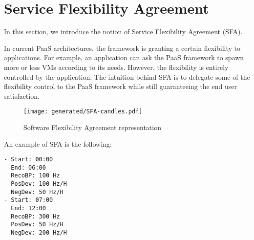 \section{Service Flexibility Agreement}
\label{sec:sfa}

In this section, we introduce the notion of Service Flexibility Agreement (SFA). 

In current PaaS architectures, the framework is granting a certain flexibility to applications.
For example, an application can ask the PaaS framework to spawn more or less VMs according to its needs.
However, the flexibility is entirely controlled by the application.
The intuition behind SFA is to delegate some of the flexibility control to the PaaS framework while still guaranteeing the end user satisfaction.






 

\begin{figure}[h]
\centering
\texttt{[image: generated/SFA-candles.pdf]}
\caption{Software Flexibility Agreement representation}
\label{fig:EASC}
\end{figure}

An example of SFA is the following:
\begin{lstlisting}[caption={SFA example}, label={lst:SFA}]
- Start: 00:00
  End: 06:00
  RecoBP: 100 Hz
  PosDev: 100 Hz/H
  NegDev: 50 Hz/H
- Start: 07:00
  End: 12:00
  RecoBP: 300 Hz
  PosDev: 50 Hz/H
  NegDev: 200 Hz/H
\end{lstlisting}

